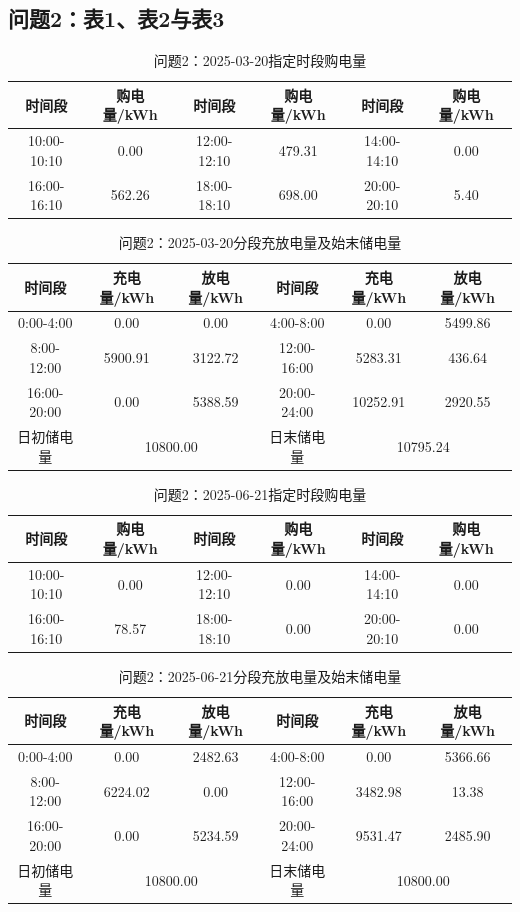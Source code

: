 \subsection{问题2：表1、表2与表3}
\begin{table}[H]\centering\scriptsize
\caption{问题2：2025-03-20指定时段购电量}
\begin{tabular}{cc|cc|cc}\toprule
时间段&购电量/kWh&时间段&购电量/kWh&时间段&购电量/kWh\\\midrule
10:00-10:10 & 0.00 & 12:00-12:10 & 479.31 & 14:00-14:10 & 0.00 \\
16:00-16:10 & 562.26 & 18:00-18:10 & 698.00 & 20:00-20:10 & 5.40 \\
\bottomrule\end{tabular}\end{table}
\begin{table}[H]\centering\scriptsize
\caption{问题2：2025-03-20分段充放电量及始末储电量}
\begin{tabular}{ccc|ccc}\toprule
时间段&充电量/kWh&放电量/kWh&时间段&充电量/kWh&放电量/kWh\\\midrule
0:00-4:00 & 0.00 & 0.00 & 4:00-8:00 & 0.00 & 5499.86 \\
8:00-12:00 & 5900.91 & 3122.72 & 12:00-16:00 & 5283.31 & 436.64 \\
16:00-20:00 & 0.00 & 5388.59 & 20:00-24:00 & 10252.91 & 2920.55 \\
\midrule 日初储电量&\multicolumn{2}{c|}{10800.00}&日末储电量&\multicolumn{2}{c}{10795.24}\\\bottomrule\end{tabular}\end{table}
\begin{table}[H]\centering\scriptsize
\caption{问题2：2025-06-21指定时段购电量}
\begin{tabular}{cc|cc|cc}\toprule
时间段&购电量/kWh&时间段&购电量/kWh&时间段&购电量/kWh\\\midrule
10:00-10:10 & 0.00 & 12:00-12:10 & 0.00 & 14:00-14:10 & 0.00 \\
16:00-16:10 & 78.57 & 18:00-18:10 & 0.00 & 20:00-20:10 & 0.00 \\
\bottomrule\end{tabular}\end{table}
\begin{table}[H]\centering\scriptsize
\caption{问题2：2025-06-21分段充放电量及始末储电量}
\begin{tabular}{ccc|ccc}\toprule
时间段&充电量/kWh&放电量/kWh&时间段&充电量/kWh&放电量/kWh\\\midrule
0:00-4:00 & 0.00 & 2482.63 & 4:00-8:00 & 0.00 & 5366.66 \\
8:00-12:00 & 6224.02 & 0.00 & 12:00-16:00 & 3482.98 & 13.38 \\
16:00-20:00 & 0.00 & 5234.59 & 20:00-24:00 & 9531.47 & 2485.90 \\
\midrule 日初储电量&\multicolumn{2}{c|}{10800.00}&日末储电量&\multicolumn{2}{c}{10800.00}\\\bottomrule\end{tabular}\end{table}
